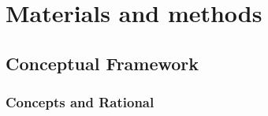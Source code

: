 \documentclass[12pt,oneside]{article}
\begin{document}
\hypertarget{materials-and-methods}{%
\section{Materials and methods}\label{materials-and-methods}}

\hypertarget{conceptual-framework}{%
\subsection{Conceptual Framework}\label{conceptual-framework}}

\hypertarget{concepts-and-rational}{%
\subsubsection{Concepts and Rational}\label{concepts-and-rational}}
\end{document}
